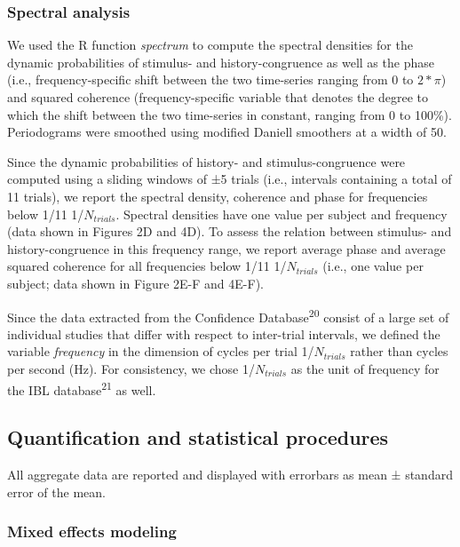 \documentclass[
]{article}
\begin{document}
\hypertarget{spectral-analysis}{%
\subsubsection{Spectral analysis}\label{spectral-analysis}}

We used the R function \emph{spectrum} to compute the spectral densities
for the dynamic probabilities of stimulus- and history-congruence as
well as the phase (i.e., frequency-specific shift between the two
time-series ranging from 0 to \(2*\pi\)) and squared coherence
(frequency-specific variable that denotes the degree to which the shift
between the two time-series in constant, ranging from 0 to 100\%).
Periodograms were smoothed using modified Daniell smoothers at a width
of 50.

Since the dynamic probabilities of history- and stimulus-congruence were
computed using a sliding windows of ±5 trials (i.e., intervals
containing a total of 11 trials), we report the spectral density,
coherence and phase for frequencies below 1/11 1/\(N_{trials}\).
Spectral densities have one value per subject and frequency (data shown
in Figures 2D and 4D). To assess the relation between stimulus- and
history-congruence in this frequency range, we report average phase and
average squared coherence for all frequencies below 1/11
1/\(N_{trials}\) (i.e., one value per subject; data shown in Figure 2E-F
and 4E-F).

Since the data extracted from the Confidence
Database\textsuperscript{20} consist of a large set of individual
studies that differ with respect to inter-trial intervals, we defined
the variable \emph{frequency} in the dimension of cycles per trial
1/\(N_{trials}\) rather than cycles per second (Hz). For consistency, we
chose 1/\(N_{trials}\) as the unit of frequency for the IBL
database\textsuperscript{21} as well.

\hypertarget{quantification-and-statistical-procedures}{%
\subsection{Quantification and statistical
procedures}\label{quantification-and-statistical-procedures}}

All aggregate data are reported and displayed with errorbars as mean ±
standard error of the mean.

\hypertarget{mixed-effects-modeling}{%
\subsubsection{Mixed effects modeling}\label{mixed-effects-modeling}}
\end{document}
